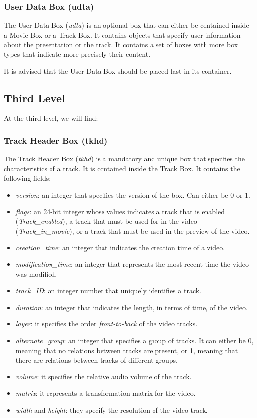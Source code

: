 \subsubsection*{User Data Box (udta)}

The User Data Box (\emph{udta}) is an optional box that can either be contained inside a Movie Box or a Track Box. It contains objects that specify user information about the presentation or the track. It contains a set of boxes with more box types that indicate more precisely their content.

It is advised that the User Data Box should be placed last in its container.

\subsection{Third Level}

At the third level, we will find:

\subsubsection*{Track Header Box (tkhd)}

The Track Header Box (\emph{tkhd}) is a mandatory and unique box that specifies the characteristics of a track. It is contained inside the Track Box. It contains the following fields:

\begin{itemize}
\item \emph{version}: an integer that specifies the version of the box. Can either be 0 or 1.
\item \emph{flags}: an 24-bit integer whose values indicates a track that is enabled (\emph{Track\_enabled}), a track that must be used for in the video (\emph{Track\_in\_movie}), or a track that must be used in the preview of the video.
\item \emph{creation\_time}: an integer that indicates the creation time of a video.
\item \emph{modification\_time}: an integer that represents the most recent time the video was modified.
\item \emph{track\_ID}: an integer number that uniquely identifies a track.
\item \emph{duration}: an integer that indicates the length, in terms of time, of the video.
\item \emph{layer}: it specifies the order \emph{front-to-back} of the video tracks.
\item \emph{alternate\_group}: an integer that specifies a group of tracks. It can either be 0, meaning that no relations between tracks are present, or 1, meaning that there are relations between tracks of different groups.
\item \emph{volume}: it specifies the relative audio volume of the track.
\item \emph{matrix}: it represents a transformation matrix for the video.
\item \emph{width} and \emph{height}: they specify the resolution of the video track.
\end{itemize}

